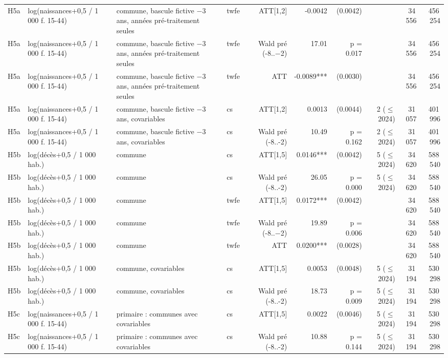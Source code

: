 \begin{table}
\begin{threeparttable}
\begin{tabular}{lp{4.1cm}p{7.2cm}lrrrrrr}
H5a & log(naissances+0,5 / 1 000 f. 15-44) & commune, bascule fictive $-$3 ans, années pré-traitement seules & twfe & ATT[1,2] & -0.0042 & (0.0042) &  & 34\,556 & 456\,254 \\
H5a & log(naissances+0,5 / 1 000 f. 15-44) & commune, bascule fictive $-$3 ans, années pré-traitement seules & twfe & Wald pré (-8..$-$2) & 17.01 & p = 0.017 &  & 34\,556 & 456\,254 \\
H5a & log(naissances+0,5 / 1 000 f. 15-44) & commune, bascule fictive $-$3 ans, années pré-traitement seules & twfe & ATT & -0.0089*** & (0.0030) &  & 34\,556 & 456\,254 \\
H5a & log(naissances+0,5 / 1 000 f. 15-44) & commune, bascule fictive $-$3 ans, covariables & cs & ATT[1,2] & 0.0013 & (0.0044) & 2 ($\leq$ 2024) & 31\,057 & 401\,996 \\
H5a & log(naissances+0,5 / 1 000 f. 15-44) & commune, bascule fictive $-$3 ans, covariables & cs & Wald pré (-8..-2) & 10.49 & p = 0.162 & 2 ($\leq$ 2024) & 31\,057 & 401\,996 \\
H5b & log(décès+0,5 / 1 000 hab.) & commune & cs & ATT[1,5] & 0.0146*** & (0.0042) & 5 ($\leq$ 2024) & 34\,620 & 588\,540 \\
H5b & log(décès+0,5 / 1 000 hab.) & commune & cs & Wald pré (-8..-2) & 26.05 & p = 0.000 & 5 ($\leq$ 2024) & 34\,620 & 588\,540 \\
H5b & log(décès+0,5 / 1 000 hab.) & commune & twfe & ATT[1,5] & 0.0172*** & (0.0042) &  & 34\,620 & 588\,540 \\
H5b & log(décès+0,5 / 1 000 hab.) & commune & twfe & Wald pré (-8..$-$2) & 19.89 & p = 0.006 &  & 34\,620 & 588\,540 \\
H5b & log(décès+0,5 / 1 000 hab.) & commune & twfe & ATT & 0.0200*** & (0.0028) &  & 34\,620 & 588\,540 \\
H5b & log(décès+0,5 / 1 000 hab.) & commune, covariables & cs & ATT[1,5] & 0.0053 & (0.0048) & 5 ($\leq$ 2024) & 31\,194 & 530\,298 \\
H5b & log(décès+0,5 / 1 000 hab.) & commune, covariables & cs & Wald pré (-8..-2) & 18.73 & p = 0.009 & 5 ($\leq$ 2024) & 31\,194 & 530\,298 \\
H5c & log(naissances+0,5 / 1 000 f. 15-44) & primaire : communes avec covariables & cs & ATT[1,5] & 0.0022 & (0.0046) & 5 ($\leq$ 2024) & 31\,194 & 530\,298 \\
H5c & log(naissances+0,5 / 1 000 f. 15-44) & primaire : communes avec covariables & cs & Wald pré (-8..-2) & 10.88 & p = 0.144 & 5 ($\leq$ 2024) & 31\,194 & 530\,298 \\

\end{tabular}
\end{threeparttable}
\end{table}

